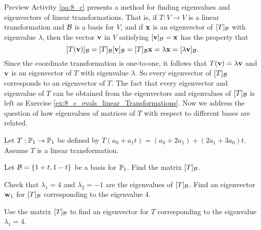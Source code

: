 \label{sec:find_eigen_trans}

Preview Activity \ref{pa:8_c} presents a method for finding eigenvalues and eigenvectors of linear transformations. That is, if $T: V \to V$ is a linear transformation and $\mathcal{B}$ is a basis for $V$, and if $\mathbf{x}$ is an eigenvector of $[T]_{\mathcal{B}}$ with eigenvalue $\lambda$, then the vector $\mathbf{v}$ in $V$ satisfying $[\mathbf{v}]_{\mathcal{B}}=\mathbf{x}$ has the property that 
\[[T(\mathbf{v})]_{\mathcal{B}} = [T]_{\mathcal{B}}[\mathbf{v}]_{\mathcal{B}} = [T]_{\mathcal{B}} \mathbf{x} = \lambda \mathbf{x} = [\lambda \mathbf{v}]_{\mathcal{B}}.\]
Since the coordinate transformation is one-to-one, it follows that $T(\mathbf{v}) = \lambda \mathbf{v}$ and $\mathbf{v}$ is an eigenvector of $T$ with eigenvalue $\lambda$. So every eigenvector of $[T]_{\mathcal{B}}$ corresponds to an eigenvector of $T$. The fact that every eigenvector and eigenvalue of $T$ can be obtained from the eigenvectors and eigenvalues of $[T]_{\mathcal{B}}$ is left as Exercise \ref{ex:8_c_evals_linear_Transformations}.  Now we address the question of how eigenvalues of matrices of $T$ with respect to different bases are related.



\begin{activity} \label{act:8_c_ltev2} Let $T: \mathbb{P}_1 \to \mathbb{P}_1$ be defined by $T(a_0+a_1t) = (a_0+2a_1) + (2a_1+3a_0)t$. Assume $T$ is a linear transformation.
	\ba
	\item Let $\mathcal{B} = \{1+t,1-t\}$ be a basis for $\mathbb{P}_1$. Find the matrix $[T]_{\mathcal{B}}$.
	
	
	\item Check that $\lambda_1 = 4$ and $\lambda_2 = -1$ are the eigenvalues of $[T]_{\mathcal{B}}$. Find an eigenvector $\mathbf{w}_1$ for $[T]_{\mathcal{B}}$ corresponding to the eigenvalue $4$.
	
	
	\item Use the matrix $[T]_{\mathcal{B}}$ to find an eigenvector for $T$ corresponding to the eigenvalue $\lambda_1 = 4$.


	\ea

\end{activity}

